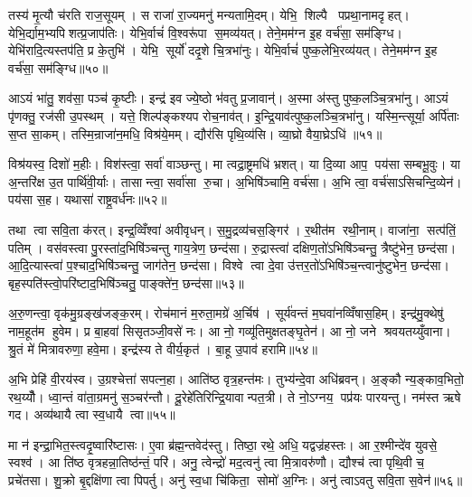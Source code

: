 तस्य॑ मृ॒त्यौ च॑रति राज॒सूयम्। स राजा॑ रा॒ज्यमनु॑ मन्यतामि॒दम्। येभि॒ शिल्पै पप्रथा॒नामदृहत्। येभि॒र्द्याम॒भ्यपिशत्प्र॒जाप॑तिः। येभि॒र्वाचं॑ वि॒श्वरू॑पा स॒मव्य॑यत्। तेने॒मम॑ग्न इ॒ह वर्च॑सा॒ सम॑ङ्ग्धि। येभि॑रादि॒त्यस्तप॑ति॒ प्र के॒तुभि॑। येभि॒ सूर्यो॑ ददृ॒शे चि॒त्रभा॑नुः। येभि॒र्वाचं॑ पुष्क॒लेभि॒रव्य॑यत्। तेने॒मम॑ग्न इ॒ह वर्च॑सा॒ सम॑ङ्ग्धि॥५०॥

आऽयं भा॑तु॒ शव॑सा॒ पञ्च॑ कृ॒ष्टीः। इन्द्र॑ इव ज्ये॒ष्ठो भ॑वतु प्र॒जावान्॑। अ॒स्मा अ॑स्तु पुष्क॒लञ्चि॒त्रभा॑नु। आऽयं पृ॑णक्तु॒ रज॑सी उ॒पस्थम्। यत्ते॒ शिल्प॑ङ्कश्यप रोच॒नाव॑त्। इ॒न्द्रि॒याव॑त्पुष्क॒लञ्चि॒त्रभा॑नु। यस्मि॒न्त्सूर्या॒ अर्पि॑ताः स॒प्त सा॒कम्। तस्मि॒न्राजा॑न॒मधि॒ विश्र॑ये॒मम्। द्यौर॑सि पृथि॒व्य॑सि। व्या॒घ्रो वैया॒घ्रेऽधि॑ ॥५१॥

विश्र॑यस्व॒ दिशो॑ म॒हीः। विश॑स्त्वा॒ सर्वा॑ वाञ्छन्तु। मा त्वद्रा॒ष्ट्रमधि॑ भ्रशत्। या दि॒व्या आप॒ पय॑सा सम्बभू॒वुः। या अ॒न्तरि॑क्ष उ॒त पार्थि॑वी॒र्याः। तासान्त्वा॒ सर्वा॑सा रु॒चा। अ॒भिषि॑ञ्चामि॒ वर्च॑सा। अ॒भि त्वा॒ वर्च॑साऽसिचन्दि॒व्येन॑। पय॑सा स॒ह। यथासा॑ राष्ट्र॒वर्ध॑नः॥५२॥

तथा त्वा सवि॒ता क॑रत्। इन्द्र॒व्विँश्वा॑ अवीवृधन्। स॒मु॒द्रव्य॑चस॒ङ्गिर॑। र॒थीत॑म रथी॒नाम्। वाजा॑ना॒ सत्प॑तिं॒ पतिम्। वस॑वस्त्वा पु॒रस्ता॑द॒भिषि॑ञ्चन्तु गाय॒त्रेण॒ छन्द॑सा। रु॒द्रास्त्वा॑ दक्षिण॒तो॑ऽभिषि॑ञ्चन्तु॒ त्रैष्टु॑भेन॒ छन्द॑सा। आ॒दि॒त्यास्त्वा॑ प॒श्चाद॒भिषि॑ञ्चन्तु॒ जाग॑तेन॒ छन्द॑सा। विश्वे त्वा दे॒वा उ॑त्तर॒तो॑ऽभिषि॑ञ्च॒न्त्वानु॑ष्टुभेन॒ छन्द॑सा। बृह॒स्पति॑स्त्वो॒परि॑ष्टाद॒भिषि॑ञ्चतु॒ पाङ्क्ते॑न॒ छन्द॑सा॥५३॥

अ॒रु॒णन्त्वा॒ वृक॑मु॒ग्रङ्ख॑जङ्क॒रम्। रोच॑मानं म॒रुता॒मग्रे॑ अ॒र्चिष॑। सूर्य॑वन्तं म॒घवा॑नव्विँषास॒हिम्। इन्द्र॑मु॒क्थेषु॑ नाम॒हूत॑म हुवेम। प्र बा॒हवा॑ सिसृतञ्जी॒वसे॑ नः। आ नो॒ गव्यू॑तिमुक्षतङ्घृ॒तेन॑। आ नो॒ जने श्रवयतय्युँवाना। श्रु॒तं मे॑ मित्रावरुणा॒ हवे॒मा। इन्द्र॑स्य ते वीर्य॒कृत॑। बा॒हू उ॒पाव॑ हरामि॥५४॥\anuvakamend[ब॒भू॒वाव्य॑य॒त्तेने॒मम॑ग्न इ॒ह वर्च॑सा॒ सम॑ङ्ग्धि॒ वैया॒घ्रेऽधि॑ राष्ट्र॒वर्ध॑न॒ पाङ्क्ते॑न॒ छन्द॑सो॒पाव॑हरामि]

अ॒भि प्रेहि॑ वी॒रय॑स्व। उ॒ग्रश्चेत्ता॑ सपत्न॒हा। आति॑ष्ठ वृत्र॒हन्त॑मः। तुभ्य॑न्दे॒वा अधि॑ब्रवन्। अ॒ङ्कौ न्य॒ङ्काव॒भितो॒ रथ॒य्यौँ। ध्वा॒न्तं वा॑ता॒ग्रमनु॑ स॒ञ्चर॑न्तौ। दू॒रेहे॑तिरिन्द्रि॒यावान्पत॒त्री। ते नो॒ऽग्नय॒ पप्र॑यः पारयन्तु। नम॑स्त ऋषे गद। अव्य॑थायै त्वा स्व॒धायै त्वा॥५५॥

मा न॑ इन्द्रा॒भित॒स्त्वदृ॒ष्वारि॑ष्टासः। ए॒वा ब्र॑ह्म॒न्तवेद॑स्तु। तिष्ठा॒ रथे॒ अधि॒ यद्वज्र॑हस्तः। आ र॒श्मीन्दे॑व युवसे॒ स्वश्व॑। आ ति॑ष्ठ वृत्रहन्ना॒तिष्ठ॑न्तं॒ परि॑। अनु॒ त्वेन्द्रो॑ मद॒त्वनु॑ त्वा मि॒त्रावरु॑णौ। द्यौश्च॑ त्वा पृथि॒वी च॒ प्रचे॑तसा। शु॒क्रो बृ॒द्दक्षि॑णा त्वा पिपर्तु। अनु॑ स्व॒धा चि॑किता॒ सोमो॑ अ॒ग्निः। अनु॑ त्वाऽवतु सवि॒ता स॒वेन॑॥५६॥


